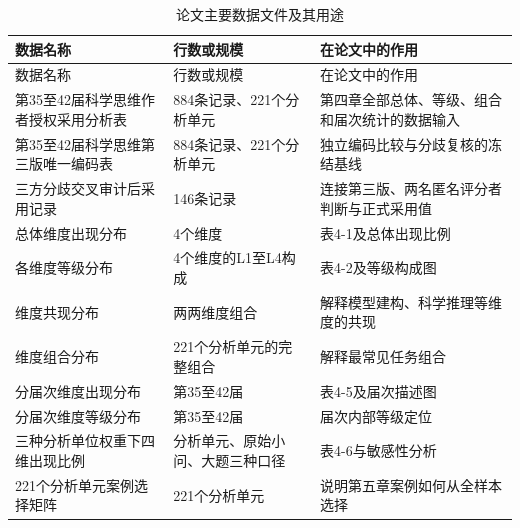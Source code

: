 \documentclass[
  12pt,
  a4paper,twoside,openany]{ctexbook}
\begin{document}
\begin{longtable}[]{@{}
  >{\raggedright\arraybackslash}p{}
  >{\raggedleft\arraybackslash}p{}
  >{\raggedright\arraybackslash}p{}@{}}
\caption{论文主要数据文件及其用途}\tabularnewline
\toprule\noalign{}
\rowcolor{ThesisPale}
\begin{minipage}[b]{\linewidth}\raggedright
数据名称
\end{minipage} & \begin{minipage}[b]{\linewidth}\raggedleft
行数或规模
\end{minipage} & \begin{minipage}[b]{\linewidth}\raggedright
在论文中的作用
\end{minipage} \\
\midrule\noalign{}
\endfirsthead
\toprule\noalign{}
\rowcolor{ThesisPale}
\begin{minipage}[b]{\linewidth}\raggedright
数据名称
\end{minipage} & \begin{minipage}[b]{\linewidth}\raggedleft
行数或规模
\end{minipage} & \begin{minipage}[b]{\linewidth}\raggedright
在论文中的作用
\end{minipage} \\
\midrule\noalign{}
\endhead
\bottomrule\noalign{}
\endlastfoot
第35至42届科学思维作者授权采用分析表 & 884条记录、221个分析单元 &
第四章全部总体、等级、组合和届次统计的数据输入 \\
第35至42届科学思维第三版唯一编码表 & 884条记录、221个分析单元 &
独立编码比较与分歧复核的冻结基线 \\
三方分歧交叉审计后采用记录 & 146条记录 &
连接第三版、两名匿名评分者判断与正式采用值 \\
总体维度出现分布 & 4个维度 & 表4-1及总体出现比例 \\
各维度等级分布 & 4个维度的L1至L4构成 & 表4-2及等级构成图 \\
维度共现分布 & 两两维度组合 & 解释模型建构、科学推理等维度的共现 \\
维度组合分布 & 221个分析单元的完整组合 & 解释最常见任务组合 \\
分届次维度出现分布 & 第35至42届 & 表4-5及届次描述图 \\
分届次维度等级分布 & 第35至42届 & 届次内部等级定位 \\
三种分析单位权重下四维出现比例 & 分析单元、原始小问、大题三种口径 &
表4-6与敏感性分析 \\
221个分析单元案例选择矩阵 & 221个分析单元 &
说明第五章案例如何从全样本选择 \\
\end{longtable}
\end{document}
